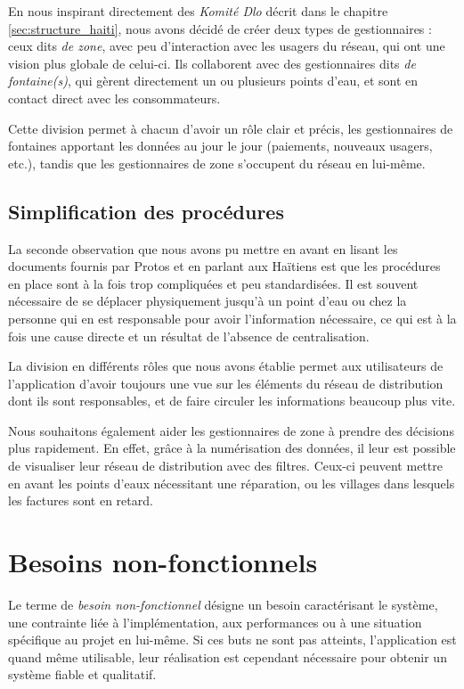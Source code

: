 \documentclass{EPL-master-thesis-covers-FR}
\begin{document}
				En nous inspirant directement des \emph{Komité Dlo} décrit dans le chapitre \ref{sec:structure_haiti}, nous avons décidé de créer deux types de gestionnaires : ceux dits \emph{de zone}, avec peu d'interaction avec les usagers du réseau, qui ont une vision plus globale de celui-ci. Ils collaborent avec des gestionnaires dits \emph{de fontaine(s)}, qui gèrent directement un ou plusieurs points d'eau, et sont en contact direct avec les consommateurs.

				Cette division permet à chacun d'avoir un rôle clair et précis, les gestionnaires de fontaines apportant les données au jour le jour (paiements, nouveaux usagers, etc.), tandis que les gestionnaires de zone s'occupent du réseau en lui-même.

			\subsection*{Simplification des procédures}
				La seconde observation que nous avons pu mettre en avant en lisant les documents fournis par Protos et en parlant aux Haïtiens est que les procédures en place sont à la fois trop compliquées et peu standardisées. Il est souvent nécessaire de se déplacer physiquement jusqu'à un point d'eau ou chez la personne qui en est responsable pour avoir l'information nécessaire, ce qui est à la fois une cause directe et un résultat de l'absence de centralisation.

				La division en différents rôles que nous avons établie permet aux utilisateurs de l'application d'avoir toujours une vue sur les éléments du réseau de distribution dont ils sont responsables, et de faire circuler les informations beaucoup plus vite.

				Nous souhaitons également aider les gestionnaires de zone à prendre des décisions plus rapidement. En effet, grâce à la numérisation des données, il leur est possible de visualiser leur réseau de distribution avec des filtres. Ceux-ci peuvent mettre en avant les points d'eaux nécessitant une réparation, ou les villages dans lesquels les factures sont en retard.


		\section{Besoins non-fonctionnels}

			Le terme de \emph{besoin non-fonctionnel} désigne un besoin caractérisant le système, une contrainte liée à l'implémentation, aux performances ou à une situation spécifique au projet en lui-même. Si ces buts ne sont pas atteints, l'application est quand même utilisable, leur réalisation est cependant nécessaire pour obtenir un système fiable et qualitatif.
\end{document}
